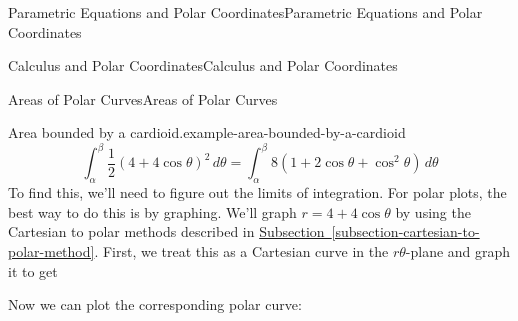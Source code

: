 \documentclass[10pt,]{book}
\numberwithin{equation}{section}
\begin{document}
\begin{chapterptx}{Parametric Equations and Polar Coordinates}{}{Parametric Equations and Polar Coordinates}{}{}
\begin{sectionptx}{Calculus and Polar Coordinates}{}{Calculus and Polar Coordinates}{}{}
\begin{subsectionptx}{Areas of Polar Curves}{}{Areas of Polar Curves}{}{}
\begin{example}{Area bounded by a cardioid.}{example-area-bounded-by-a-cardioid}
%
\begin{equation*}
\int_{\alpha}^{\beta}\frac{1}{2}(4+4\cos\theta)^{2}\,d\theta = \int_{\alpha}^{\beta}8(1+2\cos\theta+\cos^{2}\theta)\,d\theta
\end{equation*}
\hypertarget{p-832}{}%
To find this, we'll need to figure out the limits of integration. For polar plots, the best way to do this is by graphing. We'll graph \(r=4+4\cos\theta\) by using the Cartesian to polar methods described in \hyperref[subsection-cartesian-to-polar-method]{Subsection~\ref{subsection-cartesian-to-polar-method}}. First, we treat this as a Cartesian curve in the \(r\theta\)-plane and graph it to get%
\begin{figure}
\centering
{
}
\end{figure}
\hypertarget{p-833}{}%
Now we can plot the corresponding polar curve:%
\begin{figure}
\centering
{
}
\end{figure}
\end{example}
\end{subsectionptx}
\end{sectionptx}
\end{chapterptx}
\end{document}
